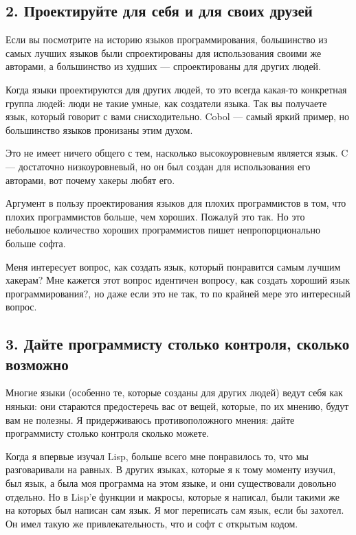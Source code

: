 \documentclass[ebook,12pt,oneside,openany]{memoir}
\begin{document}
\subsection{2. Проектируйте для себя и для своих друзей}

Если вы посмотрите на историю языков программирования, большинство из
самых лучших языков были спроектированы для использования своими же
авторами, а большинство из худших — спроектированы для других людей. \newline

Когда языки проектируются для других людей, то это всегда какая-то
конкретная группа людей: люди не такие умные, как создатели языка. Так
вы получаете язык, который говорит с вами снисходительно. Cobol —
самый яркий пример, но большинство языков пронизаны этим духом. \newline

Это не имеет ничего общего с тем, насколько высокоуровневым является
язык. C — достаточно низкоуровневый, но он был создан для
использования его авторами, вот почему хакеры любят его. \newline

Аргумент в пользу проектирования языков для плохих программистов в
том, что плохих программистов больше, чем хороших. Пожалуй это так. Но
это небольшое количество хороших программистов пишет непропорционально
больше софта. \newline

Меня интересует вопрос, как создать язык, который понравится самым
лучшим хакерам? Мне кажется этот вопрос идентичен вопросу, как создать
хороший язык программирования?, но даже если это не так, то по крайней
мере это интересный вопрос. \newline

\subsection{3. Дайте программисту столько контроля, сколько возможно}

Многие языки (особенно те, которые созданы для других людей) ведут
себя как няньки: они стараются предостеречь вас от вещей, которые, по
их мнению, будут вам не полезны. Я придерживаюсь противоположного
мнения: дайте программисту столько контроля сколько можете. \newline

Когда я впервые изучал Lisp, больше всего мне понравилось то, что мы
разговаривали на равных. В других языках, которые я к тому моменту
изучил, был язык, а была моя программа на этом языке, и они
существовали довольно отдельно. Но в Lisp'е функции и макросы, которые
я написал, были такими же на которых был написан сам язык. Я мог
переписать сам язык, если бы захотел. Он имел такую же
привлекательность, что и софт с открытым кодом. \newline
\end{document}
